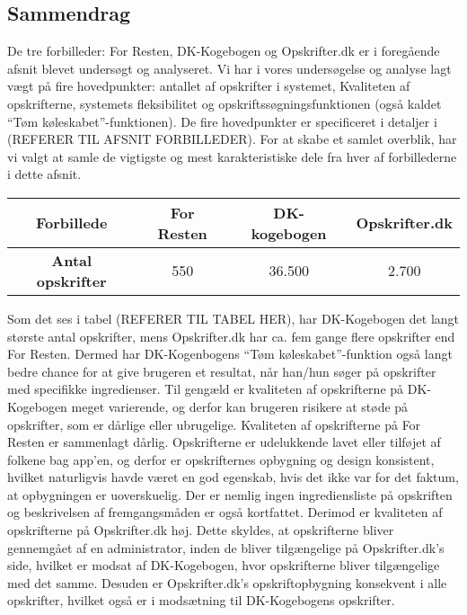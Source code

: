 \subsection{Sammendrag}
De tre forbilleder: For Resten, DK-Kogebogen og Opskrifter.dk er i foregående afsnit blevet undersøgt og analyseret. Vi har i vores undersøgelse og analyse lagt vægt på fire hovedpunkter: antallet af opskrifter i systemet, Kvaliteten af opskrifterne, systemets fleksibilitet og opskriftssøgningsfunktionen (også kaldet ``Tøm køleskabet''-funktionen). De fire hovedpunkter er specificeret i detaljer i (REFERER TIL AFSNIT FORBILLEDER). For at skabe et samlet overblik, har vi valgt at samle de vigtigste og mest karakteristiske dele fra hver af forbillederne i dette afsnit.

\begin{table}
\centering
\begin{tabular}{| c | c | c | c |}
\hline
\textbf{Forbillede} & For Resten & DK-kogebogen & Opskrifter.dk \\ \hline
\textbf{Antal opskrifter} & 550 & 36.500 & 2.700 \\ \hline
\end{tabular}
\label{table:forbilledeantal}
\end{table}

Som det ses i tabel (REFERER TIL TABEL HER), har DK-Kogebogen det langt største antal opskrifter, mens Opskrifter.dk har ca. fem gange flere opskrifter end For Resten. Dermed har DK-Kogenbogens ``Tøm køleskabet''-funktion også langt bedre chance for at give brugeren et resultat, når han/hun søger på opskrifter med specifikke ingredienser. Til gengæld er kvaliteten af opskrifterne på DK-Kogebogen meget varierende, og derfor kan brugeren risikere at støde på opskrifter, som er dårlige eller ubrugelige. Kvaliteten af opskrifterne på For Resten er sammenlagt dårlig. Opskrifterne er udelukkende lavet eller tilføjet af folkene bag app’en, og derfor er opskrifternes opbygning og design konsistent, hvilket naturligvis havde været en god egenskab, hvis det ikke var for det faktum, at opbygningen er uoverskuelig. Der er nemlig ingen ingrediensliste på opskriften og beskrivelsen af fremgangsmåden er også kortfattet. Derimod er kvaliteten af opskrifterne på Opskrifter.dk høj. Dette skyldes, at opskrifterne bliver gennemgået af en administrator, inden de bliver tilgængelige på Opskrifter.dk’s side, hvilket er modsat af DK-Kogebogen, hvor opskrifterne bliver tilgængelige med det samme. Desuden er Opskrifter.dk’s opskriftopbygning konsekvent i alle opskrifter, hvilket også er i modsætning til DK-Kogebogens opskrifter.

